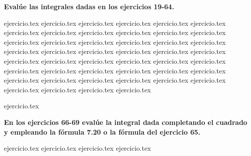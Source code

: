 \vspace{0.5cm}
\noindent\textbf{Evalúe las integrales dadas en los ejercicios 19-64.}
\begin{enumerate}
    \setcounter{enumi}{18}
    {ejercicio.tex}
{ejercicio.tex}
{ejercicio.tex}
{ejercicio.tex}
{ejercicio.tex}
{ejercicio.tex}
{ejercicio.tex}
{ejercicio.tex}
{ejercicio.tex}
{ejercicio.tex}
{ejercicio.tex}
{ejercicio.tex}
{ejercicio.tex}
{ejercicio.tex}
{ejercicio.tex}
{ejercicio.tex}
{ejercicio.tex}
{ejercicio.tex}
{ejercicio.tex}
{ejercicio.tex}
{ejercicio.tex}
{ejercicio.tex}
{ejercicio.tex}
{ejercicio.tex}
{ejercicio.tex}
{ejercicio.tex}
{ejercicio.tex}
{ejercicio.tex}
{ejercicio.tex}
{ejercicio.tex}
{ejercicio.tex}
{ejercicio.tex}
{ejercicio.tex}
{ejercicio.tex}
{ejercicio.tex}
{ejercicio.tex}
{ejercicio.tex}
{ejercicio.tex}
{ejercicio.tex}
{ejercicio.tex}
{ejercicio.tex}
{ejercicio.tex}
{ejercicio.tex}
{ejercicio.tex}
{ejercicio.tex}
{ejercicio.tex}
\end{enumerate}

\vspace{0.5cm}
\begin{enumerate}
    \setcounter{enumi}{64}
    {ejercicio.tex}
\end{enumerate}

\vspace{0.5cm}
\noindent\textbf{En los ejercicios 66-69 evalúe la integral dada completando el cuadrado y empleando la fórmula 7.20 o la fórmula del ejercicio 65.}
\begin{enumerate}
    \setcounter{enumi}{65}
    {ejercicio.tex}
{ejercicio.tex}
{ejercicio.tex}
{ejercicio.tex}
\end{enumerate}

